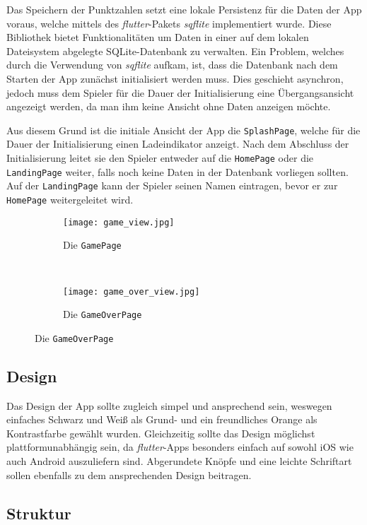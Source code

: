 Das Speichern der Punktzahlen setzt eine lokale Persistenz für die Daten der App voraus, welche mittels des \emph{flutter}-Pakets \emph{sqflite} implementiert wurde.
Diese Bibliothek bietet Funktionalitäten um Daten in einer auf dem lokalen Dateisystem abgelegte SQLite-Datenbank zu verwalten.
Ein Problem, welches durch die Verwendung von \emph{sqflite} aufkam, ist, dass die Datenbank nach dem Starten der App zunächst initialisiert werden muss.
Dies geschieht asynchron, jedoch muss dem Spieler für die Dauer der Initialisierung eine Übergangsansicht angezeigt werden, da man ihm keine Ansicht ohne Daten anzeigen möchte.

Aus diesem Grund ist die initiale Ansicht der App die \texttt{SplashPage}, welche für die Dauer der Initialisierung einen Ladeindikator anzeigt.
Nach dem Abschluss der Initialisierung leitet sie den Spieler entweder auf die \texttt{HomePage} oder die \texttt{LandingPage} weiter, falls noch keine Daten in der Datenbank vorliegen sollten.
Auf der \texttt{LandingPage} kann der Spieler seinen Namen eintragen, bevor er zur \texttt{HomePage} weitergeleitet wird.

\begin{figure}[h]
  \centering
  \begin{subfigure}[b]{0.4\textwidth}
    \texttt{[image: game\_view.jpg]}
    \caption{Die \texttt{GamePage}}
  \end{subfigure}
  ~
  \begin{subfigure}[b]{0.4\textwidth}
    \texttt{[image: game\_over\_view.jpg]}
    \caption{Die \texttt{GameOverPage}}
  \end{subfigure}
\end{figure}

\subsection{Design}

Das Design der App sollte zugleich simpel und ansprechend sein, weswegen einfaches Schwarz und Weiß als Grund- und ein freundliches Orange als Kontrastfarbe gewählt wurden.
Gleichzeitig sollte das Design möglichst plattformunabhängig sein, da \emph{flutter}-Apps besonders einfach auf sowohl iOS wie auch Android auszuliefern sind.
Abgerundete Knöpfe und eine leichte Schriftart sollen ebenfalls zu dem ansprechenden Design beitragen.

\subsection{Struktur}

